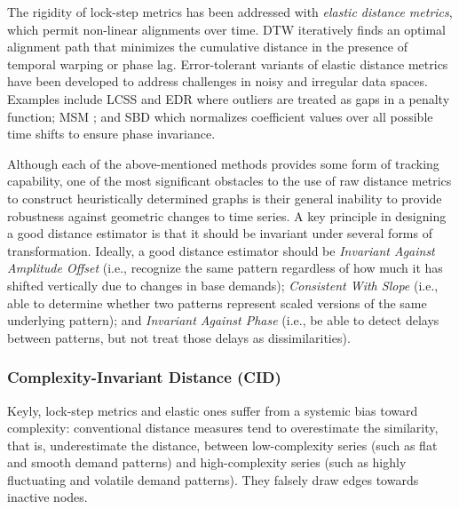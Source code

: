 The rigidity of lock-step metrics has been addressed with \emph{elastic distance metrics}, which permit non-linear alignments over time. DTW iteratively finds an optimal alignment path that minimizes the cumulative distance in the presence of temporal warping or phase lag. Error-tolerant variants of elastic distance metrics have been developed to address challenges in noisy and irregular data spaces. Examples include LCSS and EDR \cite{chen2005robust} where outliers are treated as gaps in a penalty function; MSM \cite{stefan2013msm}; and SBD \cite{paparrizos2015kshape} which normalizes coefficient values over all possible time shifts to ensure phase invariance.

Although each of the above-mentioned methods provides some form of tracking capability, one of the most significant obstacles to the use of raw distance metrics to construct heuristically determined graphs is their general inability to provide robustness against geometric changes to time series. A key principle in designing a good distance estimator is that it should be invariant under several forms of transformation. Ideally, a good distance estimator should be \emph{Invariant Against Amplitude Offset} (i.e., recognize the same pattern regardless of how much it has shifted vertically due to changes in base demands); \emph{Consistent With Slope} (i.e., able to determine whether two patterns represent scaled versions of the same underlying pattern); and \emph{Invariant Against Phase} (i.e., be able to detect delays between patterns, but not treat those delays as dissimilarities).

\subsubsection{Complexity-Invariant Distance (CID)}
Keyly, lock-step metrics and elastic ones suffer from a systemic bias toward complexity: conventional distance measures tend to overestimate the similarity, that is, underestimate the distance, between low-complexity series (such as flat and smooth demand patterns) and high-complexity series (such as highly fluctuating and volatile demand patterns). They falsely draw edges towards inactive nodes.

